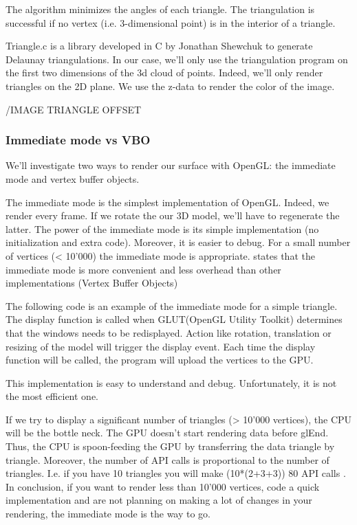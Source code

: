 The algorithm minimizes the angles of each triangle. The triangulation is successful if no vertex (i.e. 3-dimensional point) is in the interior of a triangle.

Triangle.c is a library developed in C by Jonathan Shewchuk \cite{shewchuk96b} to generate Delaunay triangulations. In our case, we'll only use the triangulation program on the first two dimensions of the 3d cloud of points. Indeed, we'll only render triangles on the 2D plane. We use the z-data to render the color of the image.

/IMAGE TRIANGLE OFFSET


\subsubsection{Immediate mode vs VBO}

We'll investigate two ways to render our surface with OpenGL: the immediate mode and vertex buffer objects.

The immediate mode is the simplest implementation of OpenGL. Indeed, we render  every frame. If we rotate the our 3D model, we'll have to regenerate the latter. The power of the immediate mode is its simple implementation (no initialization and extra code). Moreover, it is easier to debug. For a small number of vertices (< 10'000) the immediate mode is appropriate. \cite{opengl1} states that the immediate mode is more convenient and less overhead than other implementations (Vertex Buffer Objects)

The following code is an example of the immediate mode for a simple triangle. The display function is called when GLUT(OpenGL Utility Toolkit) determines that the windows needs to be redisplayed. Action like rotation, translation or resizing of the model will trigger the display event. Each time the display function will be called, the program will upload the vertices to the GPU.

This implementation is easy to understand and debug. Unfortunately, it is not the most efficient one. 

If we try to display a significant number of triangles (> 10'000 vertices), the CPU will be the bottle neck. The GPU doesn't start rendering data before glEnd. Thus, the CPU is spoon-feeding the GPU by transferring the data triangle by triangle. Moreover, the number of API calls is proportional to the number of triangles. I.e. if you have 10 triangles you will make (10*(2+3+3)) 80 API calls \cite{opengllegacy}. In conclusion, if you want to render less than 10'000 vertices, code a quick implementation and are not planning on making a lot of changes in your rendering, the immediate mode is the way to go.


